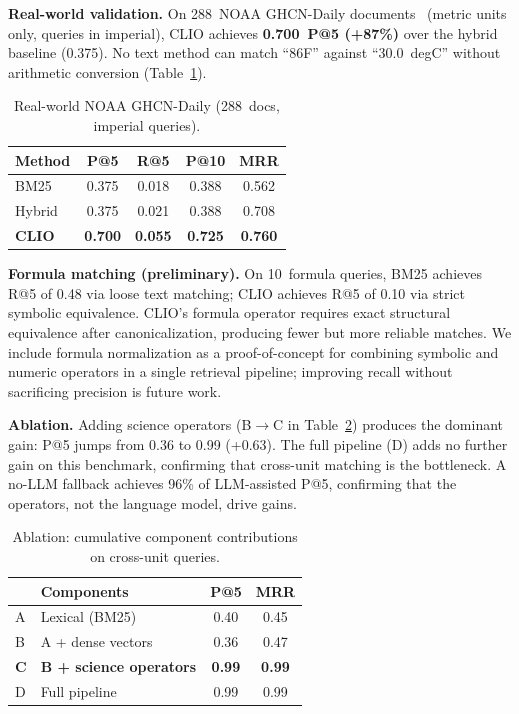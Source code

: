 \textbf{Real-world validation.} On 288~NOAA GHCN-Daily
documents~\cite{ghcn2012} (metric units only, queries in imperial),
CLIO achieves \textbf{0.700~P@5 (+87\%)} over the hybrid baseline
(0.375). No text method can match ``86\textdegree F'' against
``30.0~degC'' without arithmetic conversion
(Table~\ref{tab:real_world}).

\begin{table}[!t]
\centering
\caption{Real-world NOAA GHCN-Daily (288~docs, imperial queries).}
\label{tab:real_world}
\small
\begin{tabular}{lcccc}
\toprule
\textbf{Method} & \textbf{P@5} & \textbf{R@5} & \textbf{P@10} & \textbf{MRR} \\
\midrule
BM25            & 0.375 & 0.018 & 0.388 & 0.562 \\
\rowcolor{gray!5}
Hybrid          & 0.375 & 0.021 & 0.388 & 0.708 \\
\rowcolor{gray!15}
\textbf{CLIO}   & \textbf{0.700} & \textbf{0.055} & \textbf{0.725} & \textbf{0.760} \\
\bottomrule
\end{tabular}
\end{table}

\textbf{Formula matching (preliminary).} On 10~formula queries, BM25
achieves R@5 of 0.48 via loose text matching; CLIO achieves R@5 of
0.10 via strict symbolic equivalence. CLIO's formula operator requires
exact structural equivalence after canonicalization, producing fewer
but more reliable matches. We include formula normalization as a
proof-of-concept for combining symbolic and numeric operators in a
single retrieval pipeline; improving recall without sacrificing
precision is future work.

\textbf{Ablation.} Adding science operators (B$\to$C in
Table~\ref{tab:ablation}) produces the dominant gain: P@5 jumps from
0.36 to 0.99 (+0.63). The full pipeline (D) adds no further gain on
this benchmark, confirming that cross-unit matching is the bottleneck.
A no-LLM fallback achieves 96\% of LLM-assisted P@5, confirming that
the operators, not the language model, drive gains.

\begin{table}[!t]
\centering
\caption{Ablation: cumulative component contributions on cross-unit queries.}
\label{tab:ablation}
\small
\renewcommand{\arraystretch}{1.2}
\begin{tabular}{l l c c}
\toprule
 & \textbf{Components} & \textbf{P@5} & \textbf{MRR} \\
\midrule
A & Lexical (BM25)             & 0.40 & 0.45 \\
\rowcolor{gray!5}
B & A + dense vectors          & 0.36 & 0.47 \\
\rowcolor{gray!15}
\textbf{C} & \textbf{B + science operators} & \textbf{0.99} & \textbf{0.99} \\
\rowcolor{gray!5}
D & Full pipeline              & 0.99 & 0.99 \\
\bottomrule
\end{tabular}
\renewcommand{\arraystretch}{1.15}
\end{table}

